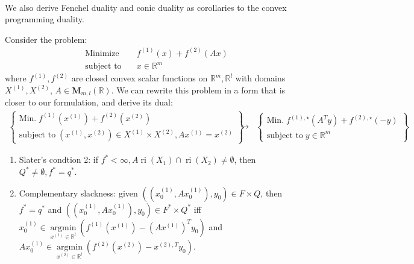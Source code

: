 \paragraph{}We also derive Fenchel duality and conic duality as corollaries to the convex programming duality.

\begin{coro}\label{coro:044-fenchel}
	Consider the problem:
	\begin{align*}
		\text{Minimize}\quad   & f^{(1)}(x)+f^{(2)}(Ax) \\
		\text{subject to}\quad & x\in \mathbb{R}^m
	\end{align*}
	where $f^{(1)},f^{(2)}$ are closed convex scalar functions on $\mathbb{R}^m,\mathbb{R}^l$ with domains $X^{(1)},X^{(2)}$, $A\in \mathbf{M}_{m,l}(\mathbb{R})$. We can rewrite this problem in a form that is closer to our formulation, and derive its dual:
	\[
		\begin{matrix}
			\begin{Bmatrix}
				\text{Min.}\;    f^{(1)}(x^{(1)})+f^{(2)}(x^{(2)}) \\
				\text{subject to}\;  (x^{(1)},x^{(2)})\in X^{(1)}\times X^{(2)},Ax^{(1)}=x^{(2)}
			\end{Bmatrix} & \leftrightarrow &
			\begin{Bmatrix}
				\text{Min.}\;    f^{(1),\star}(A^Ty)+f^{(2),\star}(-y) \\
				\text{subject to}\;    y\in \mathbb{R}^m
			\end{Bmatrix}
		\end{matrix}
	\]
	\begin{enumerate}[label=(\alph*)]
		\item Slater's condtion 2: if $f^\ast<\infty,A \operatorname{ri}(X_1)\cap \operatorname{ri}(X_2)\neq\emptyset$, then $Q^\ast\neq\emptyset,f^\ast=q^\ast$.
		\item Complementary slackness: given $((x^{(1)}_0,Ax^{(1)}_0),y_0)\in F\times Q$, then $f^\ast=q^\ast$ and $((x^{(1)}_0,Ax^{(1)}_0),y_0)\in F^\ast\times Q^\ast$ iff $x_0^{(1)}\in \underset{x^{(1)}\in \mathbb{R}^l}{\operatorname{argmin}}\left(f^{(1)}(x^{(1)})-(Ax^{(1)})^Ty_0\right)$ and $Ax_0^{(1)}\in \underset{x^{(2)}\in \mathbb{R}^l}{\operatorname{argmin}}\left(f^{(2)}(x^{(2)})-x^{(2),T}y_0\right)$.
	\end{enumerate}
\end{coro}


